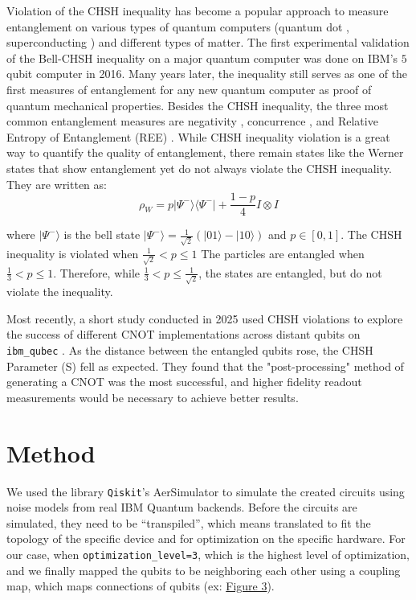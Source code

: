 \documentclass{article}
\begin{document}
Violation of the CHSH inequality has become a popular approach to measure entanglement on various types of quantum computers (quantum dot \cite{steinacker2025bell}, superconducting \cite{storz2023loophole}) and different types of matter. The first experimental validation of the Bell-CHSH inequality on a major quantum computer was done on IBM’s $5$ qubit computer in 2016. Many years later, the inequality still serves as one of the first measures of entanglement for any new quantum computer as proof of quantum mechanical properties. Besides the CHSH inequality, the three most common entanglement measures are negativity \cite{PhysRevA.65.032314}, concurrence \cite{PhysRevLett.80.2245}, and Relative Entropy of Entanglement (REE) \cite{PhysRevLett.78.2275}. While CHSH inequality violation is a great way to quantify the quality of entanglement, there remain states like the Werner states that show entanglement yet do not always violate the CHSH inequality. They are written as:
$$\rho_W = p|\Psi^-\rangle \langle\Psi^-| + \frac{1 - p}{4}I \otimes I$$

where $|\Psi^-\rangle$ is the bell state $|\Psi^-\rangle = \frac{1}{\sqrt{2}} (|01\rangle - |10\rangle)$ and $p \in [0,1]$. 
 The CHSH inequality is violated when 
$\frac{1}{\sqrt{2}} < p \leq 1$
The particles are entangled when 
$\frac{1}{3} < p \leq 1$.
Therefore, while $\frac{1}{3} < p \leq \frac{1}{\sqrt{2}}$, the states are entangled, but do not violate the inequality. 


Most recently, a short study conducted in 2025 used CHSH violations to explore the success of different CNOT implementations across distant qubits on \verb|ibm_qubec| \cite{waring2025chshviolationsusingdynamic}. As the distance between the entangled qubits rose, the CHSH Parameter (S) fell as expected. They found that the "post-processing" method of generating a CNOT was the most successful, and higher fidelity readout measurements would be necessary to achieve better results.

\section{Method}

We used the library \verb|Qiskit|’s AerSimulator \cite{qiskit2024} to simulate the created circuits using noise models from real IBM Quantum backends. Before the circuits are simulated, they need to be “transpiled”, which means translated to fit the topology of the specific device and for optimization on the specific hardware. For our case, when \verb|optimization_level=3|, which is the highest level of optimization, and we finally mapped the qubits to be neighboring each other using a coupling map, which maps connections of qubits (ex: \hyperref[fig:coupling-map]{Figure 3}). 
\end{document}
